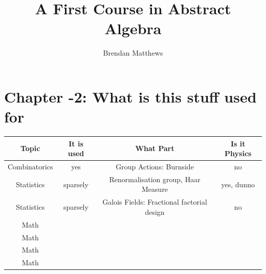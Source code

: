 \newtheorem{lemma}{Lemma}
\newtheorem{theorem}{Theorem}
\newtheorem{cor}{Corollary}
\newcommand{\an}[1]{\langle \, #1 \, \rangle}
\newcommand{\GL}{\text{GL}(\mathbb{R}^n)}
\newcommand{\GLM}{\text{GL}(n,\mathbb{R})}
\newcommand{\quo}{/ _\sim}
\newcommand{\phii}{\phi^{-1}}
\newcommand{\pa}{\partial}
\newcommand{\lb}{\left}
\newcommand{\rb}{\right}
\newcommand{\aps}{\alpha_S}
\newcommand{\apl}{\alpha_L}
\newcommand{\tdd}{\frac{d^2T}{dx^2}}
\newcommand{\dx}{\frac{d}{dx}}
\newcommand{\seq}{(x_n)_{n \geq 1}}
\newcommand{\sseq}{(x_{n_k})_{k \geq 1}}
\newcommand{\fseq}{(f_n)_{n \geq 1}}
\newcommand{\elll}{\ell^{\infty}(\N)}
\newcommand{\norm}{{\|.\|}}
\newcommand{\inner}{\langle .,. \rangle}
\newcommand*\dd{\, \mathop{}\!\mathrm{d}}
\newcommand*\DD[1]{\, \mathop{}\!\mathrm{d^#1}}
\newcommand{\Ga}[1]{\frac{1}{\sqrt{2\pi\sigma^2}} e^{-\frac{\left(#1\right)^2}{2\sigma^2}}}
\usepackage{color}
\newcommand*\autoop{\left(}
\newcommand*\autocp{\right)}
\newcommand*\autoob{\left[}
\newcommand*\autocb{\right]}
\DeclareRobustCommand*\{{\ifmmode \left\lbrace \else \textbraceleft \fi }
\DeclareRobustCommand*\}{\ifmmode \right\rbrace \else \textbraceright \fi }
\AtBeginDocument {%
   \mathcode`( 32768
   \mathcode`) 32768
   \mathcode`[ 32768
   \mathcode`] 32768
   \begingroup
       \lccode`\~`(
       \lowercase{%
   \endgroup
       \let~\autoop
   }\begingroup
       \lccode`\~`)
       \lowercase{%
   \endgroup
       \let~\autocp
   }\begingroup
       \lccode`\~`[
       \lowercase{%
   \endgroup
       \let~\autoob
   }\begingroup
       \lccode`\~`]
       \lowercase{%
   \endgroup
       \let~\autocb
   }}


\makeatletter
%
\makeatother
\author{Brendan Matthews}
\title{A First Course in Abstract Algebra}

\maketitle{}
\newpage{}
\section*{Chapter -2: What is this stuff used for}
\begin{tabular}{cccc}
\hline
\textbf{Topic} & \textbf{It is used} & \textbf{What Part} & \textbf{Is it Physics} \\
\hline
Combinatorics & yes & Group Actions: Burnside & no\\
Statistics & sparsely & Renormalisation group, Haar Measure & yes, dunno  \\
Statistics &sparsely & Galois Fields: Fractional factorial design & no \\
Math &&& \\
Math &&& \\
Math &&& \\
Math &&& \\
\hline
\end{tabular}
